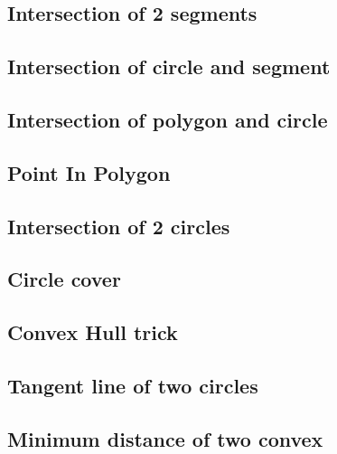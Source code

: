 \documentclass[a4paper,10pt,twocolumn,oneside]{article}
\begin{document}
\subsection{Intersection of 2 segments}


\subsection{Intersection of circle and segment}


\subsection{Intersection of polygon and circle}


\subsection{Point In Polygon}


\subsection{Intersection of 2 circles}
\subsection{Circle cover}


%

\subsection{Convex Hull trick}


\subsection{Tangent line of two circles}


\subsection{Minimum distance of two convex}

\end{document}
